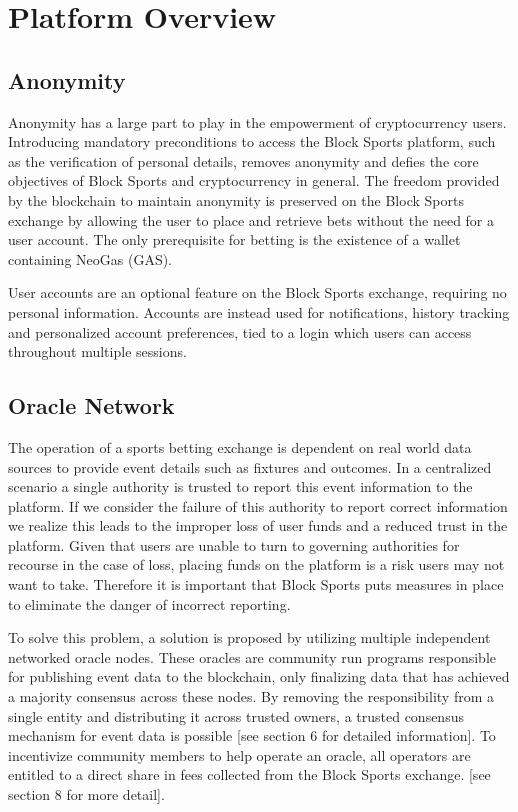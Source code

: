 \documentclass{article}
\begin{document}
\section{Platform Overview}

	\subsection{Anonymity}
Anonymity has a large part to play in the empowerment of cryptocurrency users. Introducing mandatory preconditions to access the Block Sports platform, such as the verification of personal details, removes anonymity and defies the core objectives of Block Sports and cryptocurrency in general. The freedom provided by the blockchain to maintain anonymity is preserved on the Block Sports exchange by allowing the user to place and retrieve bets without the need for a user account. The only prerequisite for betting is the existence of a wallet containing NeoGas (GAS).

User accounts are an optional feature on the Block Sports exchange, requiring no personal information. Accounts are instead used for notifications, history tracking and personalized account preferences, tied to a login which users can access throughout multiple sessions.

	\subsection{Oracle Network}
The operation of a sports betting exchange is dependent on real world data sources to provide event details such as fixtures and outcomes. In a centralized scenario a single authority is trusted to report this event information to the platform. If we consider the failure of this authority to report correct information we realize this leads to the improper loss of user funds and a reduced trust in the platform. Given that users are unable to turn to governing authorities for recourse in the case of loss, placing funds on the platform is a risk users may not want to take. Therefore it is important that Block Sports puts measures in place to eliminate the danger of incorrect reporting.

To solve this problem, a solution is proposed by utilizing multiple independent networked oracle nodes. These oracles are community run programs responsible for publishing event data to the blockchain, only finalizing data that has achieved a majority consensus across these nodes. By removing the responsibility from a single entity and distributing it across trusted owners, a trusted consensus mechanism for event data is possible [see section 6 for detailed information]. To incentivize community members to help operate an oracle, all operators are entitled to a direct share in fees collected from the Block Sports exchange. [see section 8 for more detail].
\end{document}
